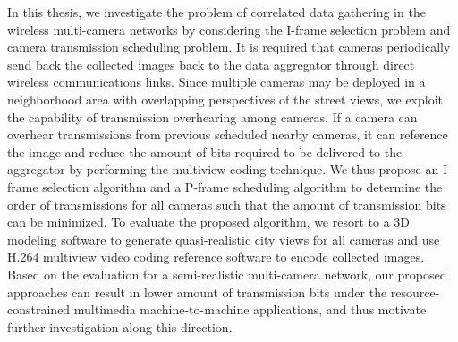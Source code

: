 In this thesis, we investigate the problem of correlated data gathering in the wireless multi-camera networks by considering the I-frame selection problem and camera transmission scheduling problem.
It is required that cameras periodically send back the collected images back to the data aggregator through direct wireless communications links.
Since multiple cameras may be deployed in a neighborhood area with overlapping perspectives of the street views, we exploit the capability of transmission overhearing among cameras.
If a camera can overhear transmissions from previous scheduled nearby cameras, it can reference the image and reduce the amount of bits required to be delivered to the aggregator by performing the multiview coding technique.
We thus propose an I-frame selection algorithm and a P-frame scheduling algorithm to determine the order of transmissions for all cameras such that the amount of transmission bits can be minimized.
To evaluate the proposed algorithm, we resort to a 3D modeling software to generate quasi-realistic city views for all cameras and use H.264 multiview video coding reference software to encode collected images.
Based on the evaluation for a semi-realistic multi-camera network, our proposed approaches can result in lower amount of transmission bits under the resource-constrained multimedia machine-to-machine applications, and thus motivate further investigation along this direction.
